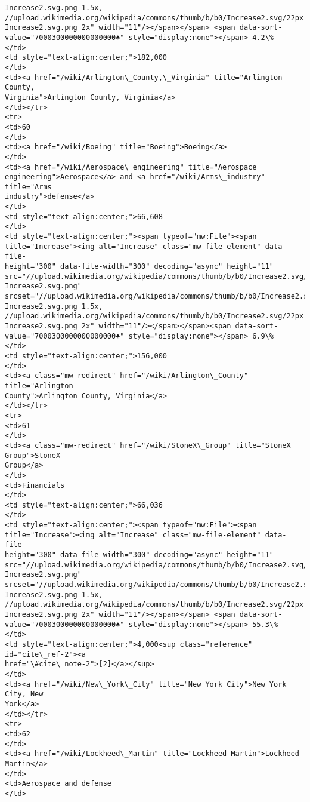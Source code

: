 \documentclass[11pt]{article}
\begin{document}
\begin{Verbatim}[commandchars=\\\{\}]
Increase2.svg.png 1.5x,
//upload.wikimedia.org/wikipedia/commons/thumb/b/b0/Increase2.svg/22px-
Increase2.svg.png 2x" width="11"/></span></span> <span data-sort-
value="7000300000000000000♠" style="display:none"></span> 4.2\%
</td>
<td style="text-align:center;">182,000
</td>
<td><a href="/wiki/Arlington\_County,\_Virginia" title="Arlington County,
Virginia">Arlington County, Virginia</a>
</td></tr>
<tr>
<td>60
</td>
<td><a href="/wiki/Boeing" title="Boeing">Boeing</a>
</td>
<td><a href="/wiki/Aerospace\_engineering" title="Aerospace
engineering">Aerospace</a> and <a href="/wiki/Arms\_industry" title="Arms
industry">defense</a>
</td>
<td style="text-align:center;">66,608
</td>
<td style="text-align:center;"><span typeof="mw:File"><span
title="Increase"><img alt="Increase" class="mw-file-element" data-file-
height="300" data-file-width="300" decoding="async" height="11"
src="//upload.wikimedia.org/wikipedia/commons/thumb/b/b0/Increase2.svg/11px-
Increase2.svg.png"
srcset="//upload.wikimedia.org/wikipedia/commons/thumb/b/b0/Increase2.svg/17px-
Increase2.svg.png 1.5x,
//upload.wikimedia.org/wikipedia/commons/thumb/b/b0/Increase2.svg/22px-
Increase2.svg.png 2x" width="11"/></span></span><span data-sort-
value="7000300000000000000♠" style="display:none"></span> 6.9\%
</td>
<td style="text-align:center;">156,000
</td>
<td><a class="mw-redirect" href="/wiki/Arlington\_County" title="Arlington
County">Arlington County, Virginia</a>
</td></tr>
<tr>
<td>61
</td>
<td><a class="mw-redirect" href="/wiki/StoneX\_Group" title="StoneX Group">StoneX
Group</a>
</td>
<td>Financials
</td>
<td style="text-align:center;">66,036
</td>
<td style="text-align:center;"><span typeof="mw:File"><span
title="Increase"><img alt="Increase" class="mw-file-element" data-file-
height="300" data-file-width="300" decoding="async" height="11"
src="//upload.wikimedia.org/wikipedia/commons/thumb/b/b0/Increase2.svg/11px-
Increase2.svg.png"
srcset="//upload.wikimedia.org/wikipedia/commons/thumb/b/b0/Increase2.svg/17px-
Increase2.svg.png 1.5x,
//upload.wikimedia.org/wikipedia/commons/thumb/b/b0/Increase2.svg/22px-
Increase2.svg.png 2x" width="11"/></span></span> <span data-sort-
value="7000300000000000000♠" style="display:none"></span> 55.3\%
</td>
<td style="text-align:center;">4,000<sup class="reference" id="cite\_ref-2"><a
href="\#cite\_note-2">[2]</a></sup>
</td>
<td><a href="/wiki/New\_York\_City" title="New York City">New York City, New
York</a>
</td></tr>
<tr>
<td>62
</td>
<td><a href="/wiki/Lockheed\_Martin" title="Lockheed Martin">Lockheed Martin</a>
</td>
<td>Aerospace and defense
</td>

\end{Verbatim}
\end{document}
